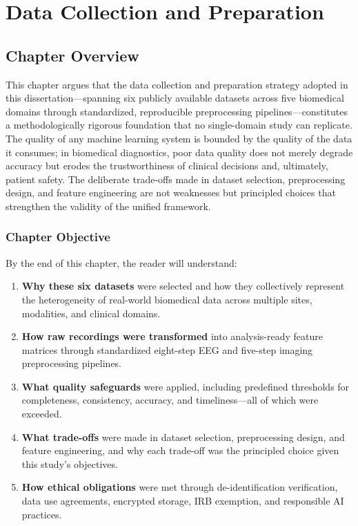 
\chapter{Data Collection and Preparation}
\label{chap:data}

\section{Chapter Overview}
\label{sec:data_intro}

This chapter argues that the data collection and preparation strategy adopted in this dissertation---spanning six publicly available datasets across five biomedical domains through standardized, reproducible preprocessing pipelines---constitutes a methodologically rigorous foundation that no single-domain study can replicate. The quality of any machine learning system is bounded by the quality of the data it consumes; in biomedical diagnostics, poor data quality does not merely degrade accuracy but erodes the trustworthiness of clinical decisions and, ultimately, patient safety. The deliberate trade-offs made in dataset selection, preprocessing design, and feature engineering are not weaknesses but principled choices that strengthen the validity of the unified framework.

\subsection{Chapter Objective}
\label{sec:data_objective}

By the end of this chapter, the reader will understand:

\begin{enumerate}[label=(\alph*)]
    \item \textbf{Why these six datasets} were selected and how they collectively represent the heterogeneity of real-world biomedical data across multiple sites, modalities, and clinical domains.
    \item \textbf{How raw recordings were transformed} into analysis-ready feature matrices through standardized eight-step EEG and five-step imaging preprocessing pipelines.
    \item \textbf{What quality safeguards} were applied, including predefined thresholds for completeness, consistency, accuracy, and timeliness---all of which were exceeded.
    \item \textbf{What trade-offs} were made in dataset selection, preprocessing design, and feature engineering, and why each trade-off was the principled choice given this study's objectives.
    \item \textbf{How ethical obligations} were met through de-identification verification, data use agreements, encrypted storage, IRB exemption, and responsible AI practices.
\end{enumerate}

